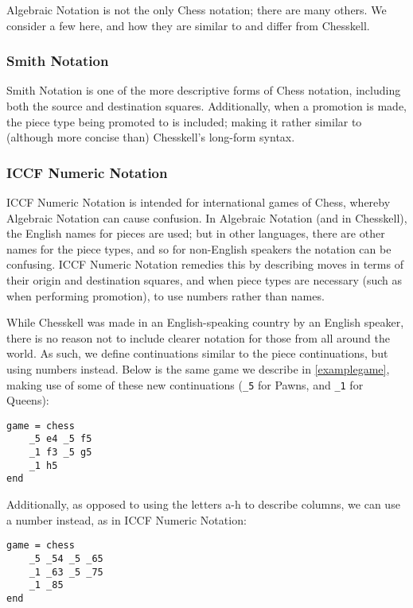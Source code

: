 \documentclass[12pt, a4paper, bibliography=totocnumbered]{scrreprt}
\newcommand{\inline}[1]{\lstinline[basicstyle=\ttfamily\footnotesize]{#1}}
\begin{document}
Algebraic Notation is not the only Chess notation; there are many others. We consider a few here, and how they are similar to and differ from Chesskell.

\subsubsection{Smith Notation}

Smith Notation is one of the more descriptive forms of Chess notation, including both the source and destination squares. Additionally, when a promotion is made, the piece type being promoted to is included; making it rather similar to (although more concise than) Chesskell's long-form syntax.

\subsubsection{ICCF Numeric Notation}

ICCF Numeric Notation is intended for international games of Chess, whereby Algebraic Notation can cause confusion. In Algebraic Notation (and in Chesskell), the English names for pieces are used; but in other languages, there are other names for the piece types, and so for non-English speakers the notation can be confusing. ICCF Numeric Notation remedies this by describing moves in terms of their origin and destination squares, and when piece types are necessary (such as when performing promotion), to use numbers rather than names.

While Chesskell was made in an English-speaking country by an English speaker, there is no reason not to include clearer notation for those from all around the world. As such, we define continuations similar to the piece continuations, but using numbers instead. Below is the same game we describe in \cref{examplegame}, making use of some of these new continuations (\inline{_5} for Pawns, and \inline{_1} for Queens):

\begin{lstlisting}
game = chess
    _5 e4 _5 f5
    _1 f3 _5 g5
    _1 h5
end
\end{lstlisting}

Additionally, as opposed to using the letters a-h to describe columns, we can use a number instead, as in ICCF Numeric Notation:

\begin{lstlisting}
game = chess
    _5 _54 _5 _65
    _1 _63 _5 _75
    _1 _85
end
\end{lstlisting}
\end{document}
